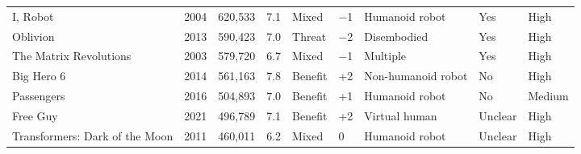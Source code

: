 \begin{table}[htbp]
\begin{tabular}{lrrrlllll}
I, Robot & 2004 & 620,533 & 7.1 & Mixed & −1 & Humanoid robot & Yes & High \\
Oblivion & 2013 & 590,423 & 7.0 & Threat & −2 & Disembodied & Yes & High \\
The Matrix Revolutions & 2003 & 579,720 & 6.7 & Mixed & −1 & Multiple & Yes & High \\
Big Hero 6 & 2014 & 561,163 & 7.8 & Benefit & +2 & Non-humanoid robot & No & High \\
Passengers & 2016 & 504,893 & 7.0 & Benefit & +1 & Humanoid robot & No & Medium \\
Free Guy & 2021 & 496,789 & 7.1 & Benefit & +2 & Virtual human & Unclear & High \\
Transformers: Dark of the Moon & 2011 & 460,011 & 6.2 & Mixed & 0 & Humanoid robot & Unclear & High \\
\bottomrule
\end{tabular}
\end{table}

